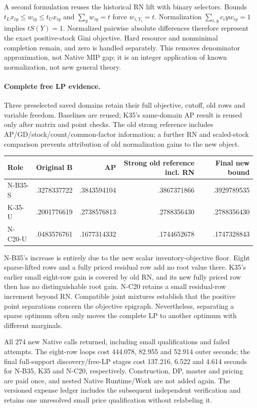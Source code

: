 A second formulation reuses the historical RN lift with binary selectors.
Bounds $t_Lx_{iy}\le w_{iy}\le t_Ux_{iy}$ and
$\sum_yw_{iy}=t$ force $w_{i,Y_i}=t$. Normalization
$\sum_{i,y}c_i y w_{iy}=1$ implies $tS(Y)=1$. Normalized pairwise absolute
differences therefore represent the exact positive-stock Gini objective.
Hard resource and nonminimal completion remain, and zero is handled
separately. This removes denominator approximation, not Native MIP gap;
it is an integer application of known normalization, not new general theory.

\paragraph{Complete free LP evidence.}
Three preselected saved domains retain their full objective, cutoff, old
rows and variable freedom. Baselines are reused; K35's same-domain AP result
is reused only after matrix and point checks. The old strong reference
includes AP/GD/stock/count/common-factor information; a further RN and
scaled-stock comparison prevents attribution of old normalization gains to
the new object.

\begin{center}
\begin{tabular}{lrrrr}
\toprule
Role & Original B & AP & Strong old reference incl. RN & Final new bound \\
\midrule
N-B35-S & .3278337722 & .3843594104 & .3867371866 & .3929789535 \\
K-35-U  & .2001776619 & .2738576813 & .2788356430 & .2788356430 \\
N-C20-U & .0483576761 & .1677314332 & .1744652678 & .1747328843 \\
\bottomrule
\end{tabular}
\end{center}

N-B35's increase is entirely due to the new scalar inventory-objective floor.
Eight sparse-lifted rows and a fully priced residual row add no root value
there. K35's earlier small eight-row gain is covered by old RN, and its new
fully priced row then has no distinguishable root gain. N-C20 retains a
small residual-row increment beyond RN. Compatible joint mixtures establish
that the positive point separations concern the objective epigraph.
Nevertheless, separating a sparse optimum often only moves the complete
LP to another optimum with different marginals.

All 274 new Native calls returned, including small qualifications and failed
attempts. The eight-row loops cost 444.078, 82.955 and 52.914 outer seconds; the
final full-support discovery/free-LP stages cost 137.216, 6.522 and 4.614 seconds
for N-B35, K35 and N-C20, respectively. Construction, DP, master and pricing
are paid once, and nested Native Runtime/Work are not added again. The
versioned expense ledger includes the subsequent independent verification
and retains one unresolved small price qualification without relabeling it.

